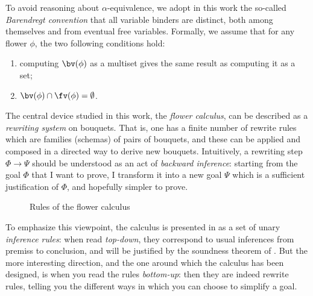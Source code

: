 To avoid reasoning about $\alpha$-equivalence, we adopt in this work the
so-called \emph{Barendregt convention} that all variable binders are distinct,
both among themselves and from eventual free variables. Formally, we assume that
for any flower $\phi$, the two following conditions hold:
\begin{enumerate}
  \item computing $\bv(\phi)$ as a multiset gives the same result as computing
  it as a set;
  \item $\bv(\phi) \cap \fv(\phi) = \emptyset$.
\end{enumerate} 

The central device studied in this work, the \emph{flower calculus}, can be
described as a \emph{rewriting system} on bouquets. That is, one has a finite
number of rewrite rules which are families (schemas) of pairs of bouquets, and
these can be applied and composed in a directed way to derive new bouquets.
Intuitively, a rewriting step $\Phi \rightarrow \Psi$ should be understood as an
act of \emph{backward inference}: starting from the goal $\Phi$ that I want to
prove, I transform it into a new goal $\Psi$ which is a sufficient justification
of $\Phi$, and hopefully simpler to prove.

\begin{figure*}
  
  \caption{Rules of the flower calculus}
\end{figure*}


To emphasize this viewpoint, the calculus is presented in
 as a set of unary \emph{inference rules}: when read
\emph{top-down}, they correspond to usual inferences from premiss to conclusion,
and will be justified by the soundness theorem of .
But the more interesting direction, and the one around which the calculus has
been designed, is when you read the rules \emph{bottom-up}: then they are indeed
rewrite rules, telling you the different ways in which you can choose to
simplify a goal.

